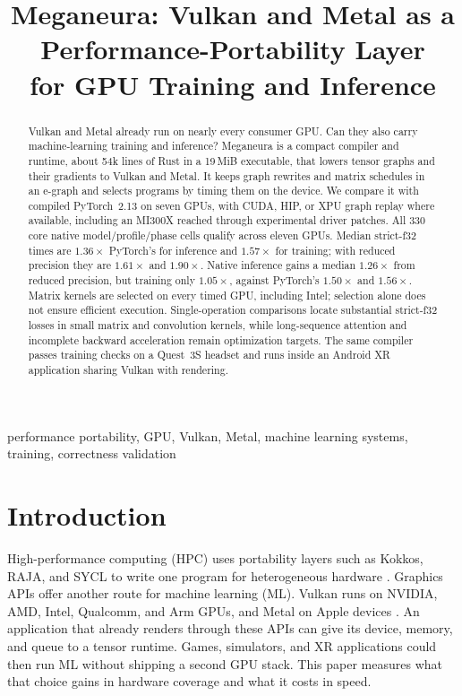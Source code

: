 \documentclass[conference]{IEEEtran}
\title{Meganeura: Vulkan and Metal as a Performance-Portability Layer\\
for GPU Training and Inference}
\author{\IEEEauthorblockN{Dzmitry Malyshau}
\IEEEauthorblockA{Independent Researcher\\
kvark@fastmail.com \quad ORCID: 0009-0005-6410-4276}}
\newcommand{\system}{Meganeura}
\begin{document}
\maketitle
\thispagestyle{plain}

\begin{abstract}
Vulkan and Metal already run on nearly every consumer GPU. Can they also
carry machine-learning training and inference? \system{} is a compact
compiler and runtime, about 54k lines of Rust in a 19\,MiB executable,
that lowers tensor graphs and their gradients to Vulkan and Metal. It keeps
graph rewrites and matrix schedules in an e-graph and selects programs by
timing them on the device. We compare it with compiled PyTorch~2.13 on seven
GPUs, with CUDA, HIP, or XPU graph replay where available, including an
MI300X reached through experimental driver patches. All 330 core native
model/profile/phase cells qualify across eleven GPUs. Median strict-f32
times are $1.36\times$ PyTorch's for inference and $1.57\times$ for training;
with reduced precision they are $1.61\times$ and $1.90\times$. Native
inference gains a median $1.26\times$ from reduced precision, but training
only $1.05\times$, against PyTorch's $1.50\times$ and $1.56\times$.
Matrix kernels are selected on every timed GPU, including Intel; selection
alone does not ensure efficient execution. Single-operation comparisons
locate substantial strict-f32 losses in small matrix and convolution kernels,
while long-sequence attention and incomplete backward acceleration remain
optimization targets. The same compiler passes training checks on a Quest~3S
headset and runs inside an Android XR application sharing Vulkan with rendering.

\end{abstract}

\begin{IEEEkeywords}
performance portability, GPU, Vulkan, Metal, machine learning systems,
training, correctness validation
\end{IEEEkeywords}

\section{Introduction}

High-performance computing (HPC) uses portability layers such as Kokkos,
RAJA, and SYCL to write one program for heterogeneous hardware
\cite{edwards2014kokkos,beckingsale2019raja,khronos2020sycl}. Graphics APIs
offer another route for machine learning (ML). Vulkan runs on NVIDIA, AMD,
Intel, Qualcomm, and Arm GPUs, and Metal on Apple devices
\cite{khronos2026vulkan,apple2026metal}. An application that already renders
through these APIs can give its device, memory, and queue to a tensor runtime.
Games, simulators, and XR applications could then run ML without shipping a
second GPU stack. This paper measures what that choice gains in hardware
coverage and what it costs in speed.
\end{document}
